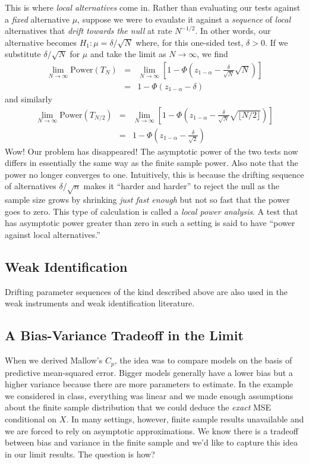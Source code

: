 \documentclass[12pt]{article}
\theoremstyle{definition}
\begin{document}
This is where \emph{local alternatives} come in. Rather than evaluating our tests against a \emph{fixed} alternative $\mu$, suppose we were to evaulate it against a \emph{sequence} of \emph{local} alternatives that \emph{drift towards the null} at rate $N^{-1/2}$. In other words, our alternative becomes $H_1 \colon \mu = \delta / \sqrt{N}$ where, for this one-sided test, $\delta > 0$. If we substitute $\delta/\sqrt{N}$ for $\mu$ and take the limit as $N\rightarrow \infty$, we find
\begin{eqnarray*}
	\lim_{N\rightarrow \infty} \mbox{Power}(T_{N}) &=& \lim_{N\rightarrow \infty}\left[1 - \Phi\left(z_{1-\alpha} - \frac{\delta}{\sqrt{N}}\sqrt{N}\right) \right]\\
	 &=& 1 - \Phi\left(z_{1-\alpha} - \delta \right)
\end{eqnarray*}
and similarly
\begin{eqnarray*}
	\lim_{N\rightarrow \infty} \mbox{Power}(T_{N/2}) &=& \lim_{N\rightarrow \infty}\left[1 - \Phi\left(z_{1-\alpha} - \frac{\delta}{\sqrt{N}}\sqrt{\lfloor N/2 \rfloor }\right) \right]\\
	 &=& 1 - \Phi\left(z_{1-\alpha} - \frac{\delta}{\sqrt{2}} \right)
\end{eqnarray*}
Wow! Our problem has disappeared! The asymptotic power of the two tests now differs in essentially the same way as the finite sample power. Also note that the power no longer converges to one. Intuitively, this is because the drifting sequence of alternatives $\delta/\sqrt{n}$ makes it ``harder and harder'' to reject the null as the sample size grows by shrinking \emph{just fast enough} but not so fast that the power goes to zero. This type of calculation is called a \emph{local power analysis}. A test that has asymptotic power greater than zero in such a setting is said to have ``power against local alternatives.''


\subsection{Weak Identification}
Drifting parameter sequences of the kind described above are also used in the weak instruments and weak identification literature. 

\subsection{A Bias-Variance Tradeoff in the Limit}
When we derived Mallow's $C_p$, the idea was to compare models on the basis of predictive mean-squared error. Bigger models generally have a lower bias but a higher variance because there are more parameters to estimate. In the example we considered in class, everything was linear and we made enough assumptions about the finite sample distribution that we could deduce the \emph{exact} MSE conditional on $X$. In many settings, however, finite sample results unavailable and we are forced to rely on asymptotic approximations. We know there is a tradeoff between bias and variance in the finite sample and we'd like to capture this idea in our limit results. The question is how?
\end{document}
